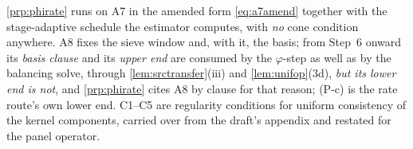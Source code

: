 \cref{prp:phirate} runs on A7 in the amended form \eqref{eq:a7amend} together with the
stage-adaptive schedule the estimator computes, with \emph{no} cone condition anywhere. A8 fixes the
sieve window and, with it, the basis; from Step~6 onward its \emph{basis clause} and its \emph{upper
end} are consumed by the $\varphi$-step as well as by the balancing solve, through
\cref{lem:srctransfer}(iii) and \cref{lem:unifop}(3d), \emph{but its lower end is not}, and
\cref{prp:phirate} cites A8 by clause for that reason; (P-c) is the rate route's own lower end. C1--C5 are
regularity conditions for uniform consistency of the kernel components, carried over from the draft's
appendix and restated for the panel operator.

